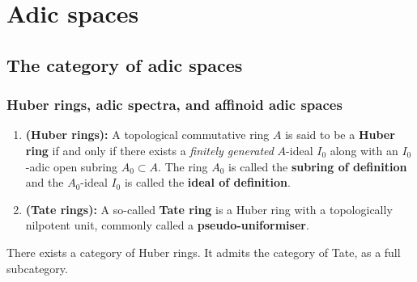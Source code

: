 \section{Adic spaces}
    \subsection{The category of adic spaces}
        \subsubsection{Huber rings, adic spectra, and affinoid adic spaces}
            \begin{definition} \label{def: huber_rings_and_tate_rings}
                \noindent
                \begin{enumerate}
                    \item \textbf{(Huber rings):} A topological commutative ring $A$ is said to be a \textbf{Huber ring} if and only if there exists a \textit{finitely generated} $A$-ideal $I_0$ along with an $I_0$-adic open subring $A_0 \subset A$. The ring $A_0$ is called the \textbf{subring of definition} and the $A_0$-ideal $I_0$ is called the \textbf{ideal of definition}.
                    \item \textbf{(Tate rings):} A so-called \textbf{Tate ring} is a Huber ring with a topologically nilpotent unit, commonly called a \textbf{pseudo-uniformiser}. 
                \end{enumerate}
            \end{definition}
            \begin{proposition} \label{prop: morphisms_of_huber_rings}
                There exists a category of Huber rings. It admits the category of Tate, as a full subcategory.
            \end{proposition}
